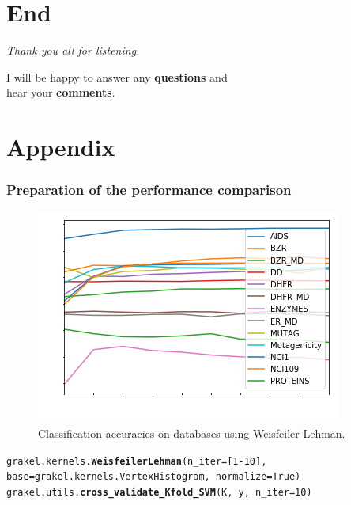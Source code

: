 \section{End}

\begin{frame}[c]
	\centering %
	\begin{huge}
		\emph{Thank you all for listening.}\\
	\end{huge}
	\vspace{2 cm}
	I will be happy to answer any \textbf{questions} and\\
	hear your \textbf{comments}.
\end{frame}

\appendix
\section{Appendix}

\begin{frame}[noframenumbering]
	\frametitle{Preparation of the performance comparison}	
	\begin{figure}
		\centering
		\includegraphics[width=0.6\linewidth]{images/plot_whiteText}
		\caption{Classification accuracies on databases using Weisfeiler-Lehman.}
		\label{fig:plot}
	\end{figure}
	\tiny{\texttt{grakel.kernels.\textbf{WeisfeilerLehman}(n\_iter=[1-10], base=grakel.kernels.VertexHistogram, normalize=True)}}\\
	\tiny{\texttt{grakel.utils.\textbf{cross\_validate\_Kfold\_SVM}(K, y, n\_iter=10)}}

\end{frame}

